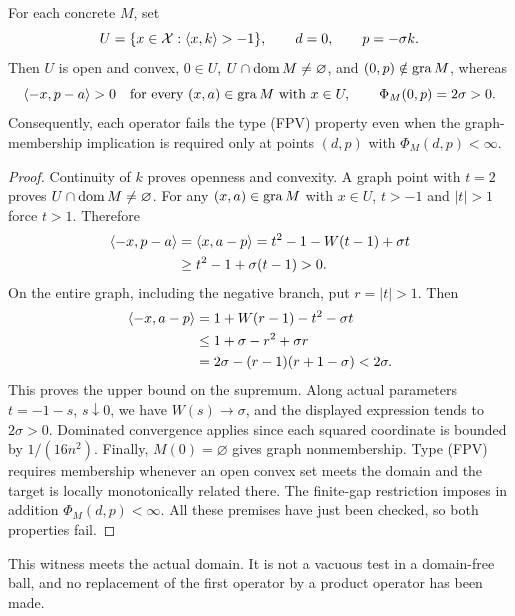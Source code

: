 \begin{corollary}\label{cor:fpv}
For each concrete $M$, set
\begin{equation}
U=\{x\in\mathcal X:\langle x,k\rangle>-1\},\qquad
d=0,\qquad p=-\sigma k.
\label{eq:cor-FPV-witness}
\end{equation}
Then $U$ is open and convex, $0\in U$, $U\cap\operatorname{dom} M\ne\varnothing$,
and $(0,p)\notin\operatorname{gra} M$, whereas
\begin{equation}
\langle -x,p-a\rangle>0
\quad\text{for every }(x,a)\in\operatorname{gra} M\text{ with }x\in U,
\qquad
\Phi_M(0,p)=2\sigma>0.
\label{eq:cor-FPV-checks}
\end{equation}
Consequently, each operator fails the type (FPV) property even when the
graph-membership implication is required only at points $(d,p)$ with
$\Phi_M(d,p)<\infty$.
\end{corollary}
\begin{proof}
Continuity of $k$ proves openness and convexity. A graph point with
$t=2$ proves $U\cap\operatorname{dom} M\ne\varnothing$. For any $(x,a)\in\operatorname{gra} M$ with $x\in U$,
$t>-1$ and $|t|>1$ force $t>1$. Therefore
\begin{align*}
\langle -x,p-a\rangle
&=\langle x,a-p\rangle=t^2-1-W(t-1)+\sigma t\\
&\ge t^2-1+\sigma(t-1)>0.
\end{align*}
On the entire graph, including the negative branch, put $r=|t|>1$.
Then
\begin{align*}
\langle -x,a-p\rangle
&=1+W(r-1)-t^2-\sigma t\\
&\le1+\sigma-r^2+\sigma r\\
&=2\sigma-(r-1)(r+1-\sigma)<2\sigma.
\end{align*}
This proves the upper bound on the supremum. Along actual parameters
$t=-1-s$, $s\downarrow0$, we have $W(s)\to\sigma$, and the displayed
expression tends to $2\sigma>0$. Dominated convergence applies since
each squared coordinate is bounded by $1/(16n^2)$.
Finally, $M(0)=\varnothing$ gives graph nonmembership. Type (FPV)
requires membership whenever an open convex set meets the domain and
the target is locally monotonically related there. The finite-gap
restriction imposes in addition $\Phi_M(d,p)<\infty$. All these premises
have just been checked, so both properties fail.
\end{proof}
This witness meets the actual domain. It is not a vacuous test in a
domain-free ball, and no replacement of the first operator by a product
operator has been made.

